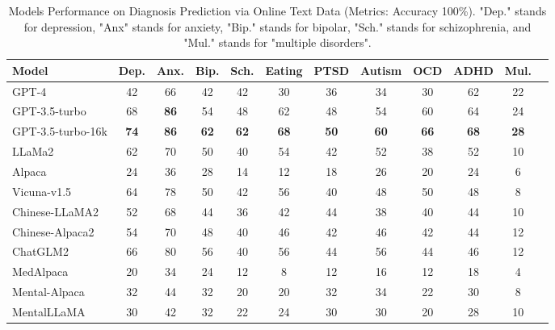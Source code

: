 \begin{table}[htbp]
\centering
\footnotesize
\begin{tabular}{l c c c c c c c c c c c}
\hline
\textbf{Model} & \textbf{Dep.} & \textbf{Anx.} & \textbf{Bip.} & \textbf{Sch.} & \textbf{Eating} & \textbf{PTSD} & \textbf{Autism} & \textbf{OCD} & \textbf{ADHD} & \textbf{Mul.}\\
\hline
GPT-4 & 42 & 66 & 42 & 42 & 30 & 36 & 34 & 30 & 62 & 22\\
GPT-3.5-turbo & 68 & \textbf{86} & 54 & 48 & 62 & 48 & 54 & 60 & 64 & 24\\
GPT-3.5-turbo-16k & \textbf{74} & \textbf{86} & \textbf{62} & \textbf{62} & \textbf{68} & \textbf{50} & \textbf{60} & \textbf{66} & \textbf{68} & \textbf{28}\\
\hline
LLaMa2 & 62 & 70 & 50 & 40 & 54 & 42 & 52 & 38 & 52 & 10\\
Alpaca & 24 & 36 & 28 & 14 & 12 & 18 & 26 & 20 & 24 & 6\\
Vicuna-v1.5 & 64 & 78 & 50 & 42 & 56 & 40 & 48 & 50 & 48 & 8\\
\hline
Chinese-LLaMA2 & 52 & 68 & 44 & 36 & 42 & 44 & 38 & 40 & 44 & 10\\
Chinese-Alpaca2 & 54 & 70 & 48 & 40 & 46 & 42 & 46 & 42 & 44 & 12\\
ChatGLM2 & 66 & 80 & 56 & 40 & 56 & 44 & 56 & 44 & 46 & 12\\
\hline
MedAlpaca & 20 & 34 & 24 & 12 & 8 & 12 & 16 & 12 & 18 & 4\\
Mental-Alpaca & 32 & 44 & 32 & 20 & 20 & 32 & 34 & 22 & 30 & 8\\
MentalLLaMA & 30 & 42 & 32 & 22 & 24 & 30 & 30 & 20 & 28 & 10\\
\hline
\end{tabular}
\caption{Models Performance on Diagnosis Prediction via Online Text Data (Metrics: Accuracy 100\%). "Dep." stands for depression, "Anx" stands for anxiety, "Bip." stands for bipolar, "Sch." stands for schizophrenia, and "Mul." stands for "multiple disorders". }
\label{tab: SMHD}
\end{table}

